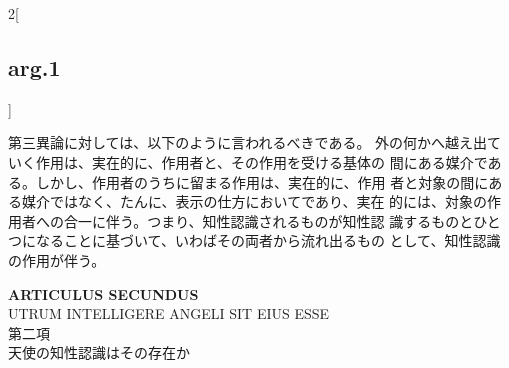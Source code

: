\documentclass[paper=a4paper,fontsize=10pt,jafontsize=9pt,titlepage]{jlreq}
\begin{document}
\begin{paracol}{2}[\subsection{arg.1}]
\switchcolumn

第三異論に対しては、以下のように言われるべきである。
外の何かへ越え出ていく作用は、実在的に、作用者と、その作用を受ける基体の
 間にある媒介である。しかし、作用者のうちに留まる作用は、実在的に、作用
 者と対象の間にある媒介ではなく、たんに、表示の仕方においてであり、実在
 的には、対象の作用者への合一に伴う。つまり、知性認識されるものが知性認
 識するものとひとつになることに基づいて、いわばその両者から流れ出るもの
 として、知性認識の作用が伴う。

\end{paracol}

\newpage
{}
{}
\setcounter{section}{2}
\setcounter{subsection}{0}





\begin{center}
 {\Large {\bfseries ARTICULUS SECUNDUS}}\\
 {\large UTRUM INTELLIGERE ANGELI SIT EIUS ESSE}\\
 {\Large 第二項\\天使の知性認識はその存在か}
\end{center}
\end{document}

